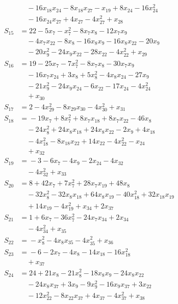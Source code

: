 \begin{align*}
&\quad{} -16x_{18}x_{24} -8x_{18}x_{27} -x_{19} +8x_{24} -16x_{24}^{2} \\
&\quad{} -16x_{24}x_{27} +4x_{27} -4x_{27}^{2} +x_{28} \\
S_{15} &={} 22 -5x_{7} -x_{7}^{2} -8x_{7}x_{8} -12x_{7}x_{9} \\
&\quad{} -4x_{7}x_{22} -8x_{8} -16x_{8}x_{9} -16x_{8}x_{22} -20x_{9} \\
&\quad{} -20x_{9}^{2} -24x_{9}x_{22} -28x_{22} -4x_{22}^{2} +x_{29} \\
S_{16} &={} 19 -25x_{7} -7x_{7}^{2} -8x_{7}x_{8} -30x_{7}x_{9} \\
&\quad{} -16x_{7}x_{24} +3x_{8} +5x_{8}^{2} -4x_{8}x_{24} -27x_{9} \\
&\quad{} -21x_{9}^{2} -24x_{9}x_{24} -6x_{22} -17x_{24} -4x_{24}^{2} \\
&\quad{} +x_{30} \\
S_{17} &={} 2 -4x_{29}^{2} -8x_{29}x_{30} -4x_{30}^{2} +x_{31} \\
S_{18} &={} -19x_{7} +8x_{7}^{2} +8x_{7}x_{18} +8x_{7}x_{22} -46x_{8} \\
&\quad{} -24x_{8}^{2} +24x_{8}x_{18} +24x_{8}x_{22} -2x_{9} +4x_{18} \\
&\quad{} -4x_{18}^{2} -8x_{18}x_{22} +14x_{22} -4x_{22}^{2} -x_{24} \\
&\quad{} +x_{32} \\
S_{19} &={} -3 -6x_{7} -4x_{9} -2x_{24} -4x_{32} \\
&\quad{} -4x_{32}^{2} +x_{33} \\
S_{20} &={} 8 +42x_{7} +7x_{7}^{2} +28x_{7}x_{19} +48x_{8} \\
&\quad{} -32x_{8}^{2} -32x_{8}x_{18} +64x_{8}x_{19} -40x_{18}^{2} +32x_{18}x_{19} \\
&\quad{} +14x_{19} -4x_{19}^{2} +x_{34} +2x_{37} \\
S_{21} &={} 1 +6x_{7} -36x_{7}^{2} -24x_{7}x_{34} +2x_{34} \\
&\quad{} -4x_{34}^{2} +x_{35} \\
S_{22} &={} -x_{8}^{2} -4x_{8}x_{35} -4x_{35}^{2} +x_{36} \\
S_{23} &={} -6 -2x_{7} -4x_{8} -14x_{18} -16x_{18}^{2} \\
&\quad{} +x_{37} \\
S_{24} &={} 24 +21x_{8} -21x_{8}^{2} -18x_{8}x_{9} -24x_{8}x_{22} \\
&\quad{} -24x_{8}x_{37} +3x_{9} -9x_{9}^{2} -16x_{9}x_{37} +3x_{22} \\
&\quad{} -12x_{22}^{2} -8x_{22}x_{37} +4x_{37} -4x_{37}^{2} +x_{38} \\

\end{align*}
